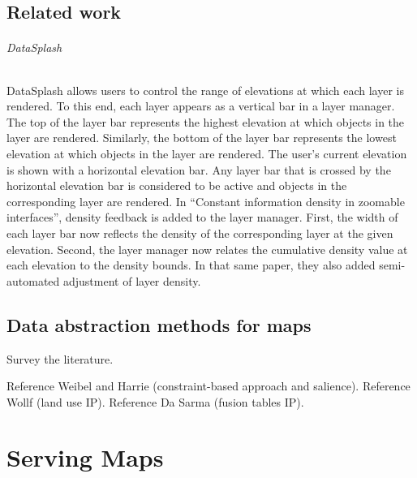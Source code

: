 \documentclass[11pt, oneside]{report}   	%
\begin{document}
\chapter{Related work}
\paragraph{DataSplash} DataSplash allows users to control the range of elevations at which each layer is rendered. To this end, each layer appears as a vertical bar in a layer manager. The top of the layer bar represents the highest elevation at which objects in the layer are rendered. Similarly, the bottom of the layer bar represents the lowest elevation at which objects in the layer are rendered. The user's current elevation is shown with a horizontal elevation bar. Any layer bar that is crossed by the horizontal elevation bar is considered to be active and objects in the corresponding layer are rendered. In ``Constant information density in zoomable interfaces'', density feedback is added to the layer manager. First, the width of each layer bar now reflects the density of the corresponding layer at the given elevation. Second, the layer manager now relates the cumulative density value at each elevation to the density bounds. In that same paper, they also added semi-automated adjustment of layer density.


\chapter{Data abstraction methods for maps}
Survey the literature.

Reference Weibel and Harrie (constraint-based approach and salience). Reference Wollf (land use IP). Reference Da Sarma (fusion tables IP).


\chapter{}


\part{Serving Maps}



\end{document}
